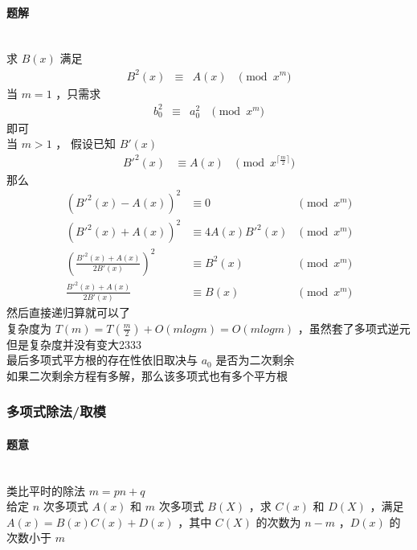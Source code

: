 	\paragraph{题解}~\\
	求 $B(x)$ 满足
	$$
	\begin{aligned}
	B^2(x)&\equiv&A(x)&\pmod{x^m}
	\end{aligned}
	$$
	当 $m=1$ ，只需求
	$$
	\begin{aligned}
	b_0^2&\equiv&a_0^2&\pmod{x^m}
	\end{aligned}
	$$
	即可\\
	当 $m>1$ ，
	假设已知 $B'(x)$
	$$
	\begin{aligned}
	{B'}^2(x)&\equiv A(x)&\pmod{x^{\lceil\frac{m}{2} \rceil}}
	\end{aligned}
	$$
	那么
	$$
	\begin{aligned}
	({B'}^2(x)-A(x))^2&\equiv0&\pmod{x^m}\\
	({B'}^2(x)+A(x))^2&\equiv4A(x)B'^2(x)&\pmod{x^m}\\
	(\frac{ {B'}^2(x)+A(x)}{2B'(x)})^2&\equiv B^2(x)&\pmod{x^m}\\
	\frac{ {B'}^2(x)+A(x)}{2{B'}(x)}&\equiv B(x)&\pmod{x^m}
	\end{aligned}
	$$
	然后直接递归算就可以了\\
	复杂度为 $T(m)=T(\frac{m}{2})+O(mlogm)=O(mlogm)$ ，虽然套了多项式逆元但是复杂度并没有变大2333\\
	最后多项式平方根的存在性依旧取决与 $a_0$ 是否为二次剩余\\
	如果二次剩余方程有多解，那么该多项式也有多个平方根\\
	\vspace{1cm}
	\subsubsection{多项式除法/取模}
	\paragraph{题意}~\\
	类比平时的除法 $m=pn+q$\\
	给定 $n$ 次多项式 $A(x)$ 和 $m$ 次多项式 $B(X)$ ，求 $C(x)$ 和 $D(X)$ ，满足 $A(x)=B(x)C(x)+D(x)$ ，其中 $C(X)$ 的次数为 $n-m$ ，$D(x)$ 的次数小于 $m$
